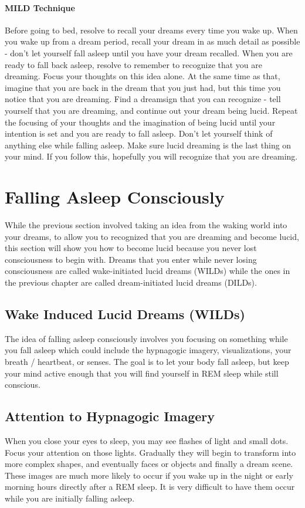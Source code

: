 \documentclass{article}
\begin{document}
\paragraph{MILD Technique} Before going to bed, resolve to recall your dreams every time you wake up. When you wake up from a dream period, recall your dream in as much detail as possible - don't let yourself fall asleep until you have your dream recalled. When you are ready to fall back asleep, resolve to remember to recognize that you are dreaming. Focus your thoughts on this idea alone. At the same time as that, imagine that you are back in the dream that you just had, but this time you notice that you are dreaming. Find a dreamsign that you can recognize - tell yourself that you are dreaming, and continue out your dream being lucid. Repeat the focusing of your thoughts and the imagination of being lucid until your intention is set and you are ready to fall asleep. Don't let yourself think of anything else while falling asleep. Make sure lucid dreaming is the last thing on your mind. If you follow this, hopefully you will recognize that you are dreaming.

\section{Falling Asleep Consciously}
While the previous section involved taking an idea from the waking world into your dreams, to allow you to recognized that you are dreaming and become lucid, this section will show you how to become lucid because you never lost consciousness to begin with. Dreams that you enter while never losing consciousness are called wake-initiated lucid dreams (WILDs) while the ones in the previous chapter are called dream-initiated lucid dreams (DILDs).

\subsection{Wake Induced Lucid Dreams (WILDs)}
The idea of falling asleep consciously involves you focusing on something while you fall asleep which could include the hypnagogic imagery, visualizations, your breath / heartbeat, or senses. The goal is to let your body fall asleep, but keep your mind active enough that you will find yourself in REM sleep while still conscious.

\subsection{Attention to Hypnagogic Imagery}
When you close your eyes to sleep, you may see flashes of light and small dots. Focus your attention on those lights. Gradually they will begin to transform into more complex shapes, and eventually faces or objects and finally a dream scene. These images are much more likely to occur if you wake up in the night or early morning hours directly after a REM sleep. It is very difficult to have them occur while you are initially falling asleep.
\end{document}
